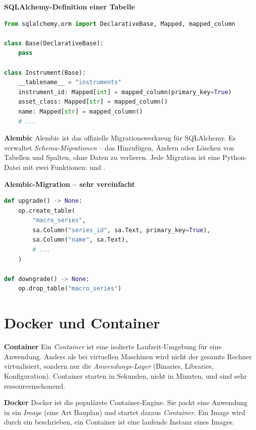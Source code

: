 \begin{beispiel}
\textbf{SQLAlchemy-Definition einer Tabelle}
\begin{lstlisting}[language=python]
from sqlalchemy.orm import DeclarativeBase, Mapped, mapped_column

class Base(DeclarativeBase):
    pass

class Instrument(Base):
    __tablename__ = "instruments"
    instrument_id: Mapped[int] = mapped_column(primary_key=True)
    asset_class: Mapped[str] = mapped_column()
    name: Mapped[str] = mapped_column()
    # ...
\end{lstlisting}
\end{beispiel}

\begin{definition}
\textbf{Alembic}
Alembic ist das offizielle Migrationswerkzeug für SQLAlchemy. Es
verwaltet \emph{Schema-Migrationen} -- das Hinzufügen, Ändern oder
Löschen von Tabellen und Spalten, ohne Daten zu verlieren. Jede
Migration ist eine Python-Datei mit zwei Funktionen: 
und .
\end{definition}

\begin{beispiel}
\textbf{Alembic-Migration -- sehr vereinfacht}
\begin{lstlisting}[language=python]
def upgrade() -> None:
    op.create_table(
        "macro_series",
        sa.Column("series_id", sa.Text, primary_key=True),
        sa.Column("name", sa.Text),
        # ...
    )

def downgrade() -> None:
    op.drop_table("macro_series")
\end{lstlisting}
\end{beispiel}

\section{Docker und Container}

\begin{definition}
\textbf{Container}
Ein \emph{Container} ist eine isolierte Laufzeit-Umgebung für eine
Anwendung. Anders als bei virtuellen Maschinen wird nicht der
gesamte Rechner virtualisiert, sondern nur die
\emph{Anwendungs-Layer} (Binaries, Libraries, Konfiguration).
Container starten in Sekunden, nicht in Minuten, und sind sehr
ressourcenschonend.
\end{definition}

\begin{definition}
\textbf{Docker}
Docker ist die populärste Container-Engine. Sie packt eine Anwendung
in ein \emph{Image} (eine Art Bauplan) und startet daraus
\emph{Container}. Ein Image wird durch ein 
beschrieben, ein Container ist eine laufende Instanz eines Images.
\end{definition}

